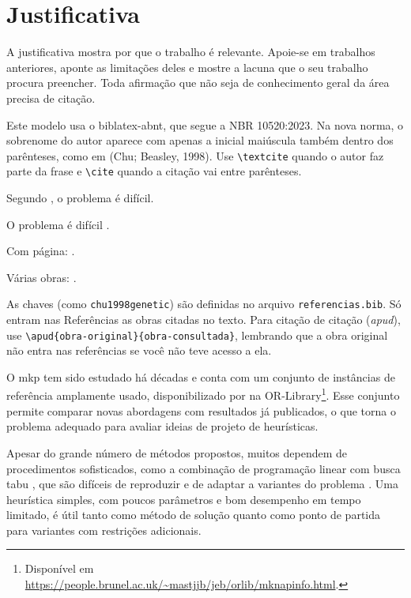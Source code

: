 \section{Justificativa}
\label{sec:introducao:justificativa}

\begin{instrucao}
A justificativa mostra por que o trabalho é relevante. Apoie-se em trabalhos
anteriores, aponte as limitações deles e mostre a lacuna que o seu trabalho
procura preencher. Toda afirmação que não seja de conhecimento geral da área
precisa de citação.

Este modelo usa o biblatex-abnt, que segue a NBR 10520:2023. Na nova norma, o
sobrenome do autor aparece com apenas a inicial maiúscula também dentro dos
parênteses, como em (Chu; Beasley, 1998). Use \verb|\textcite| quando o autor
faz parte da frase e \verb|\cite| quando a citação vai entre parênteses.
\begin{exemplo}
Segundo \textcite{chu1998genetic},
o problema é difícil.

O problema é difícil
\cite{chu1998genetic}.

Com página:
\cite[p.~70]{chu1998genetic}.

Várias obras: \cite{chu1998genetic,
kellerer2004knapsack}.
\end{exemplo}
As chaves (como \verb|chu1998genetic|) são definidas no arquivo
\verb|referencias.bib|. Só entram nas Referências as obras citadas no texto.
Para citação de citação (\emph{apud}), use
\verb|\apud{obra-original}{obra-consultada}|, lembrando que a obra original
não entra nas referências se você não teve acesso a ela.
\end{instrucao}

O \acs{mkp} tem sido estudado há décadas e conta com um conjunto de instâncias
de referência amplamente usado, disponibilizado por \textcite{chu1998genetic}
na OR-Library\footnote{Disponível em
\url{https://people.brunel.ac.uk/~mastjjb/jeb/orlib/mknapinfo.html}.}. Esse
conjunto permite comparar novas abordagens com resultados já publicados, o que
torna o problema adequado para avaliar ideias de projeto de heurísticas.

Apesar do grande número de métodos propostos, muitos dependem de
procedimentos sofisticados, como a combinação de programação linear com busca
tabu \cite{vasquez2001hybrid}, que são difíceis de reproduzir e de adaptar a
variantes do problema \cite{puchinger2010multidimensional}. Uma heurística
simples, com poucos parâmetros e bom desempenho em tempo limitado, é útil
tanto como método de solução quanto como ponto de partida para variantes com
restrições adicionais.

